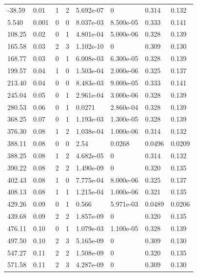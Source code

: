 \documentclass[preview]{standalone}
\begin{document}
{{\begin{tabular}{L{1.2cm}C{1.2cm} C{0.3cm}C{0.5cm} C{1.4cm}C{1.4cm} C{1.4cm}C{1.4cm}}
  -38.59  &  0.01  & 1     &  2 &  5.692e-07  & 0  & 0.314 &  0.132   \\ 
  5.540  &  0.001  & 0     &  0 &  8.037e-03  & 8.500e-05  & 0.333 &  0.141   \\ 
  108.25  &  0.02  & 0     &  1 &  4.801e-04  & 5.000e-06  & 0.328 &  0.139   \\ 
  165.58  &  0.03  & 2     &  3 &  1.102e-10  & 0  & 0.309 &  0.130   \\ 
  168.77  &  0.03  & 0     &  1 &  6.008e-03  & 6.300e-05  & 0.328 &  0.139   \\ 
  199.57  &  0.04  & 1     &  0 &  1.503e-04  & 2.000e-06  & 0.325 &  0.137   \\ 
  213.40  &  0.04  & 0     &  0 &  8.483e-03  & 9.000e-05  & 0.333 &  0.141   \\ 
  245.04  &  0.05  & 0     &  1 &  2.961e-04  & 3.000e-06  & 0.328 &  0.139   \\ 
  280.53  &  0.06  & 0     &  1 &  0.0271  & 2.860e-04  & 0.328 &  0.139   \\ 
  368.25  &  0.07  & 0     &  1 &  1.193e-03  & 1.300e-05  & 0.328 &  0.139   \\ 
  376.30  &  0.08  & 1     &  2 &  1.038e-04  & 1.000e-06  & 0.314 &  0.132   \\ 
  388.11  &  0.08  & 0     &  0 &  2.54  & 0.0268  & 0.0496 &  0.0209   \\ 
  388.25  &  0.08  & 1     &  2 &  4.682e-05  & 0  & 0.314 &  0.132   \\ 
  390.22  &  0.08  & 2     &  2 &  1.490e-09  & 0  & 0.320 &  0.135   \\ 
  402.43  &  0.08  & 1     &  0 &  7.775e-04  & 8.000e-06  & 0.325 &  0.137   \\ 
  408.13  &  0.08  & 1     &  1 &  1.215e-04  & 1.000e-06  & 0.321 &  0.135   \\ 
  429.26  &  0.09  & 0     &  1 &  0.566  & 5.971e-03  & 0.0489 &  0.0206   \\ 
  439.68  &  0.09  & 2     &  2 &  1.857e-09  & 0  & 0.320 &  0.135   \\ 
  476.11  &  0.10  & 0     &  1 &  1.079e-03  & 1.100e-05  & 0.328 &  0.139   \\ 
  497.50  &  0.10  & 2     &  3 &  5.165e-09  & 0  & 0.309 &  0.130   \\ 
  547.27  &  0.11  & 2     &  2 &  1.508e-09  & 0  & 0.320 &  0.135   \\ 
  571.58  &  0.11  & 2     &  3 &  4.287e-09  & 0  & 0.309 &  0.130   \\ 

\end{tabular}}}
\end{document}
